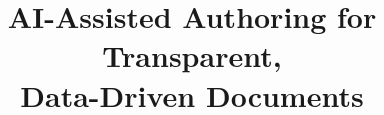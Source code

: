 \documentclass{article}
\begin{document}
\title{AI-Assisted Authoring for Transparent, \\Data-Driven Documents}

\maketitle









\appendix

\end{document}
